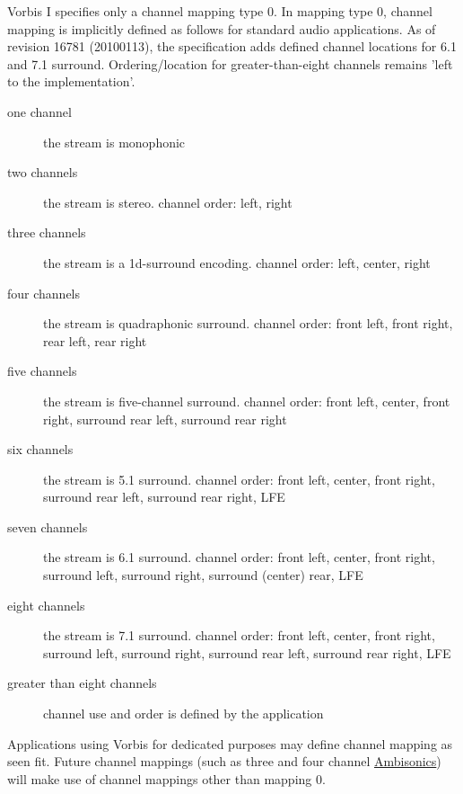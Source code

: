 Vorbis I specifies only a channel mapping type 0.  In mapping type 0,
channel mapping is implicitly defined as follows for standard audio
applications. As of revision 16781 (20100113), the specification adds
defined channel locations for 6.1 and 7.1 surround.  Ordering/location
for greater-than-eight channels remains 'left to the implementation'.

\begin{description} %
 \item[one channel]
	the stream is monophonic

\item[two channels]
	the stream is stereo.  channel order: left, right

\item[three channels]
	the stream is a 1d-surround encoding.  channel order: left,
center, right

\item[four channels]
	the stream is quadraphonic surround.  channel order: front left,
front right, rear left, rear right

\item[five channels]
	the stream is five-channel surround.  channel order: front left,
center, front right, surround rear left, surround rear right

\item[six channels]
	the stream is 5.1 surround.  channel order: front left, center, 
front right, surround rear left, surround rear right, LFE

\item[seven channels]
        the stream is 6.1 surround.  channel order: front left, center, 
front right, surround left, surround right, surround (center) rear, LFE

\item[eight channels]
        the stream is 7.1 surround.  channel order: front left, center, 
front right, surround left, surround right, surround rear left, surround rear right, 
LFE

\item[greater than eight channels]
	channel use and order is defined by the application

\end{description}

Applications using Vorbis for dedicated purposes may define channel
mapping as seen fit.  Future channel mappings (such as three and four
channel \href{http://www.ambisonic.net/}{Ambisonics}) will
make use of channel mappings other than mapping 0.


